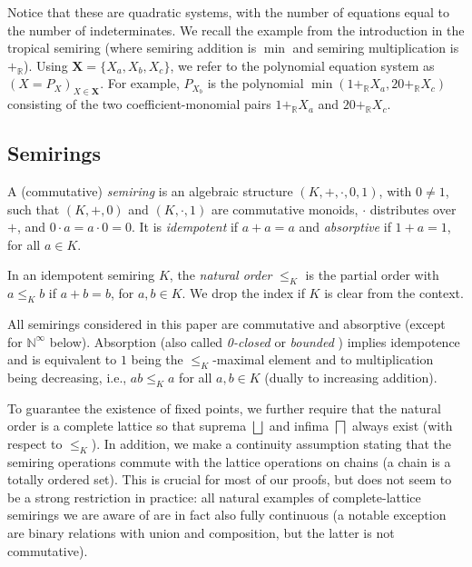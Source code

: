 \documentclass[english,runningheads,a4paper,envcountsame]{llncs}
\newenvironment{Definition}{\definition\upshape}{\enddefinition}
\newcommand{\Inf}{\bigsqcap}
\newcommand{\Sup}{\bigsqcup}
\newcommand{\Ninf}{{\mathbb N}^{\infty}}
\newcommand{\RR}{\mathbb{R}}
\newcommand*{\XX}{{\bm X}}
\newcommand{\Rplus}{+_\RR}
\begin{document}
Notice that these are quadratic systems, with the number of equations equal to the number of indeterminates.
We recall the example from the introduction in the tropical semiring (where semiring addition is $\min$ and semiring multiplication is $\Rplus$).
Using $\XX = \{X_a,X_b,X_c\}$, we refer to the polynomial equation system as $(X = P_X)_{X \in \XX}$.
For example, $P_{X_b}$ is the polynomial $\min(1 \Rplus X_a, 20 \Rplus X_c)$ consisting of the two coefficient-monomial pairs $1 \Rplus X_a$ and $20 \Rplus X_c$.




\subsection{Semirings}

\begin{Definition}
A (commutative) \emph{semiring} is an algebraic structure
$(K,+,\cdot,0,1)$, with $0\neq1$,  such that $(K,+,0)$
and $(K,\cdot,1)$ are commutative monoids, $\cdot$
distributes over $+$, and $0\cdot a=a\cdot 0=0$.
It is \emph{idempotent} if $a+a = a$ and \emph{absorptive} if $1+a=1$, for all $a \in K$.

In an idempotent semiring $K$, the \emph{natural order} $\le_K$ is the partial order
with $a \le_K b$ if $a + b = b$, for $a,b \in K$.
We drop the index if $K$ is clear from the context.
\end{Definition}


All semirings considered in this paper are commutative and absorptive (except for $\Ninf$ below).
Absorption (also called \emph{0-closed} or \emph{bounded} \cite{Mohri02})
implies idempotence and is equivalent to $1$ being the $\le_K$-maximal element and to multiplication being decreasing, i.e., $ab \le_K a$ for all $a,b \in K$ (dually to increasing addition).

To guarantee the existence of fixed points, we further require that the natural order is a complete lattice so that suprema $\Sup$ and infima $\Inf$ always exist (with respect to $\le_K$).
In addition, we make a continuity assumption stating that the semiring operations commute with the lattice operations on chains (a chain is a totally ordered set).
This is crucial for most of our proofs, but does not seem to be a strong restriction in practice: all natural examples of complete-lattice semirings we are aware of are in fact also fully continuous (a notable exception are binary relations with union and composition, but the latter is not commutative).
\end{document}
